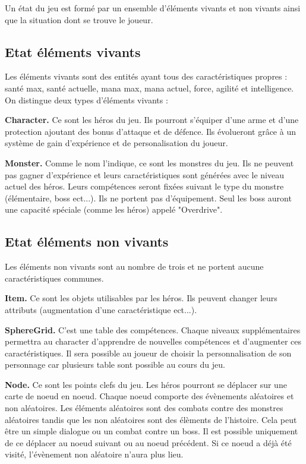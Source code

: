 \documentclass[12pt,a4paper]{report}
\begin{document}
Un \'{e}tat du jeu est form\'{e} par un ensemble d'\'{e}l\'{e}ments vivants et non vivants ainsi que la situation dont se trouve le joueur.

\subsection{Etat \'{e}l\'{e}ments vivants}

Les \'{e}l\'{e}ments vivants sont des entit\'{e}s ayant tous des caract\'{e}ristiques propres : santé max, santé actuelle, mana max, mana actuel, force, agilit\'{e} et intelligence.
On distingue deux types d'\'{e}l\'{e}ments vivants :

\textbf{Character.} Ce sont les h\'{e}ros du jeu. Ils pourront s'\'{e}quiper d'une arme et d'une protection ajoutant des bonus d'attaque et de d\'{e}fence. Ils \'{e}volueront grâce \`{a} un syst\`{e}me de gain d'exp\'{e}rience et de personalisation du joueur.  

\textbf{Monster.} Comme le nom l'indique, ce sont les monstres du jeu. Ils ne peuvent pas gagner d'exp\'{e}rience et leurs caract\'{e}ristiques sont g\'{e}n\'{e}r\'{e}es avec le niveau actuel des h\'{e}ros. Leurs comp\'{e}tences seront fix\'{e}es suivant le type du monstre (\'{e}l\'{e}mentaire, boss ect...). Ils ne portent pas d'\'{e}quipement. Seul les boss auront une capacit\'{e} sp\'{e}ciale (comme les h\'{e}ros) appel\'{e} "Overdrive".

\subsection{Etat \'{e}l\'{e}ments non vivants}

Les \'{e}l\'{e}ments non vivants sont au nombre de trois et ne portent aucune caract\'{e}ristiques communes. 

\textbf{Item.} Ce sont les objets utilisables par les h\'{e}ros. Ils peuvent changer leurs attributs (augmentation d'une caract\'{e}ristique ect...).

\textbf{SphereGrid.} C'est une table des compétences. Chaque niveaux suppl\'{e}mentaires permettra au character d'apprendre de nouvelles comp\'{e}tences et d'augmenter ces caract\'{e}ristiques. Il sera possible au joueur de choisir la personnalisation de son personnage car plusieurs table sont possible au cours du jeu.   

\textbf{Node.} Ce sont les points clefs du jeu. Les h\'{e}ros pourront se d\'{e}placer sur une carte de noeud en noeud. Chaque noeud comporte des \'{e}v\`{e}nements al\'{e}atoires et non al\'{e}atoires. Les \'{e}l\'{e}ments al\'{e}atoires sont des combats contre des monstres al\'{e}atoires tandis que les non al\'{e}atoires sont des \'{e}l\`{e}ments de l'histoire. Cela peut \^{e}tre un simple dialogue ou un combat contre un boss. Il est possible uniquement de ce d\'{e}placer au noeud suivant ou au noeud pr\'{e}c\'{e}dent. Si ce noeud a d\'{e}j\`{a} \'{e}t\'{e} visit\'{e}, l'\'{e}v\`{e}nement non al\'{e}atoire n'aura plus lieu.
\end{document}
